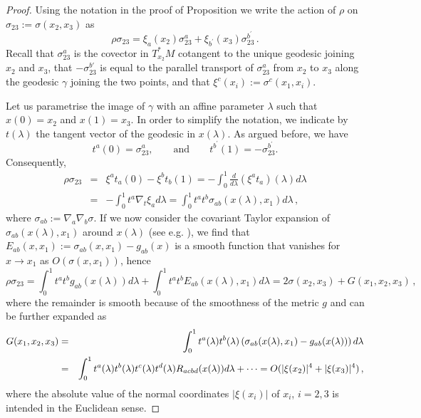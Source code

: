 \documentclass[11pt]{book}
\newcommand{\com}[1]{{\color{red}\bf #1}}
\theoremstyle{break}
\begin{document}
\com{
\begin{proof}
Using the notation in the proof of Proposition %
we write the action of $\rho$ on $\sigma_{23}:=\sigma(x_2,x_3)$ as
\[
\rho \sigma_{23}  =    \xi_a(x_2) \sigma^a_{23} + \xi_{b^\prime}(x_3)\sigma^{b^\prime}_{23}\,.
\]
Recall that $\sigma_{23}^a$ is the covector in $T^*_{x_2}M$ cotangent to the unique geodesic joining $x_2$ and $x_3$, that $-\sigma^{b'}_{23}$ is equal to the parallel transport of $\sigma^a_{23}$ from $x_2$ to $x_3$ along the geodesic $\gamma$ joining the two points, and that $\xi^c(x_i):=\sigma^c(x_1,x_i)$.


Let us parametrise the image of $\gamma$ with an affine parameter $\lambda$ such that $x(0) = x_2$ and $x(1) = x_3$. In order to simplify the notation, we indicate by $t(\lambda)$ the tangent vector of the geodesic in $x(\lambda)$. As argued before, we have
\[
t^a(0)=\sigma^a_{23},\qquad \text{and}\qquad t^{b^\prime}(1)=-\sigma^{b^\prime}_{23}.
\]   
Consequently,
\begin{eqnarray*}
\rho \sigma_{23}
&=& \xi^a t_a (0) - \xi^b t_b(1) 
= - \int_{0}^{1} \frac{d}{d\lambda} (\xi^a t_a)(\lambda) d\lambda \\
&=& - \int_{0}^{1} t^a \nabla_t  \xi_a   d\lambda  
= \int_{0}^{1} t^a t^b \sigma_{ab}(x(\lambda),x_1) d\lambda\,,
\end{eqnarray*}
where $\sigma_{ab} := \nabla_a\nabla_b \sigma$. If we now consider the covariant Taylor expansion of $\sigma_{ab}(x(\lambda),x_1)$ around $x(\lambda)$ (see e.g. %
), we find that $E_{ab}(x,x_1):=\sigma_{ab}(x,x_1) - g_{ab}(x) $ is a smooth function that vanishes for $x\to x_1$ as $O(\sigma(x,x_1))$, hence
\[
\rho\sigma_{23}  = \int_{0}^{1} t^a t^b g_{ab}(x(\lambda))    d\lambda +  \int_{0}^{1} t^a t^b E_{ab}(x(\lambda),x_1)    d\lambda  = 2\sigma(x_2,x_3) + G(x_1,x_2,x_3)\,,
\]
where the remainder is smooth because of the smoothness of the metric $g$ and can be further expanded as 
\begin{eqnarray}\label{eq:remainder-sigma}
G(x_1,x_2,x_3) &=& \int_{0}^{1} t^a(\lambda) t^b(\lambda) \left(\sigma_{ab}(x(\lambda),x_1) - g_{ab}(x(\lambda))\right) d\lambda\\ &=&  
\int_{0}^{1} t^a(\lambda) t^b(\lambda) t^c(\lambda) t^d(\lambda) R_{acbd}(x(\lambda))d\lambda + \dots = O(|\xi(x_2)|^4+|\xi(x_3)|^4)\,,\notag
\end{eqnarray}
where the absolute value of the normal coordinates $|\xi(x_i)|$ of $x_i$, $i=2,3$ is intended in the Euclidean sense.
\end{proof}
}
\end{document}
